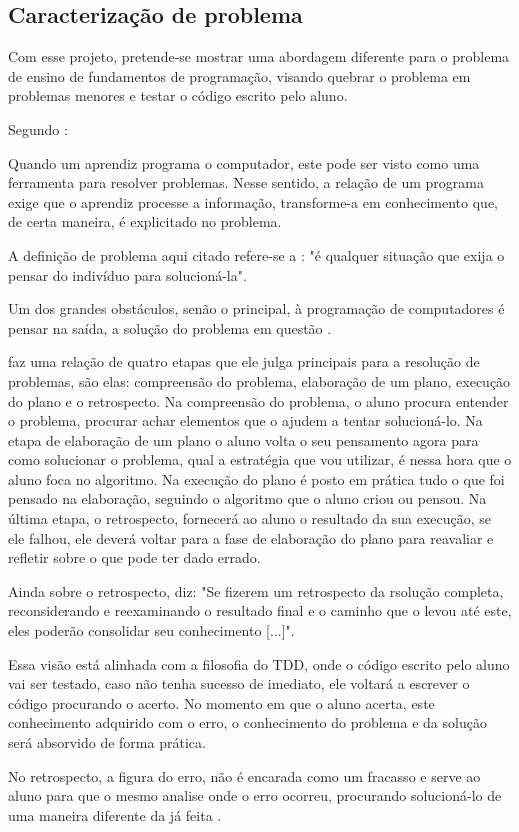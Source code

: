 \documentclass[pnumabnt,normaltoc,espacoumemeio,capchap]{abnt}
\begin{document}
\subsection{Caracterização de problema}
\par Com esse projeto, pretende-se mostrar uma abordagem diferente para o problema de ensino de fundamentos de programação, visando quebrar o problema em problemas menores e testar o código escrito pelo aluno.
\par Segundo :
\begin{citacao}
Quando um aprendiz programa o computador, este pode ser visto como uma ferramenta para resolver problemas. Nesse sentido, a relação de um programa exige que o aprendiz processe a informação, transforme-a em conhecimento que, de certa maneira, é explicitado no problema.
\end{citacao}
\par A definição de problema aqui citado refere-se a : "é qualquer situação que exija o pensar do indivíduo para solucioná-la".
\par Um dos grandes obstáculos, senão o principal, à programação de computadores é pensar na saída, a solução do problema em questão \cite{CB10}.
\par {} faz uma relação de quatro etapas que ele julga principais para a resolução de problemas, são elas: compreensão do problema, elaboração de um plano, execução do plano e o retrospecto. Na compreensão do problema, o aluno procura entender o problema, procurar achar elementos que o ajudem a tentar solucioná-lo. Na etapa de elaboração de um plano o aluno volta o seu pensamento agora para como solucionar o problema, qual a estratégia que vou utilizar, é nessa hora que o aluno foca no algoritmo. Na execução do plano é posto em prática tudo o que foi pensado na elaboração, seguindo o algoritmo que o aluno criou ou pensou. Na última etapa, o retrospecto, fornecerá ao aluno o resultado da sua execução, se ele falhou, ele deverá voltar para a fase de elaboração do plano para reavaliar e refletir sobre o que pode ter dado errado.
\par Ainda sobre o retrospecto,  diz: "Se fizerem um retrospecto da rsolução completa, reconsiderando e reexaminando o resultado final e o caminho que o levou até este, eles poderão consolidar seu conhecimento [...]".
\par Essa visão está alinhada com a filosofia do TDD, onde o código escrito pelo aluno vai ser testado, caso não tenha sucesso de imediato, ele voltará a escrever o código procurando o acerto. No momento em que o aluno acerta, este conhecimento adquirido com o erro, o conhecimento do problema e da solução será absorvido de forma prática.
\par No retrospecto, a figura do erro, não é encarada como um fracasso e serve ao aluno para que o mesmo analise onde o erro ocorreu, procurando solucioná-lo de uma maneira diferente da já feita \cite{CB10}.
\end{document}
